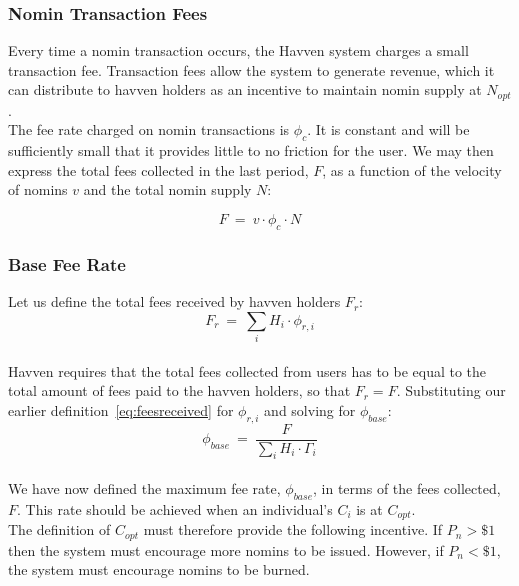 \newpage

\subsubsection{Nomin Transaction Fees}
Every time a nomin transaction occurs, the Havven system charges a small
transaction fee. Transaction fees allow the system to generate revenue, which
it can distribute to havven holders as an incentive to maintain nomin supply
at \(N_{opt}\). \\

\noindent The fee rate charged on nomin transactions is \(\phi_c\). It is
constant and will be sufficiently small that it provides little to no
friction for the user. We may then express the total fees collected in the
last period, \(F\), as a function of the velocity of nomins \(v\) and the total
nomin supply \(N\):

\begin{equation}
    F \ = \ v \cdot \phi_c \cdot N
\end{equation}

\subsubsection{Base Fee Rate}

Let us define the total fees received by havven holders \(F_{r}\): \\

\begin{equation}
F_{r} \ = \ \sum_{i} H_{i} \cdot \phi_{r,i} \label{eq:totalfeesreceived}
\end{equation} \\

\noindent Havven requires that the total fees collected from users has to be
equal to the total amount of fees paid to the havven holders, so that \(F_{r}
= F\). Substituting our earlier definition~\eqref{eq:feesreceived} for
\(\phi_{r,i}\) and solving for \(\phi_{base} \): \\

\begin{equation}
\phi_{base} \ = \ \frac{F}{\sum_{i} H_{i} \cdot \mathit{\Gamma}_{i}} \label{eq:feebase}
\end{equation} \\

\noindent We have now defined the maximum fee rate, \(\phi_{base}\), in terms
of the fees collected, \(F\). This rate should be achieved when an individual's
\(C_i\) is at \(C_{opt}\). \\

\noindent The definition of \(C_{opt}\) must therefore provide the following
incentive. If \(P_n > \$1\) then the system must encourage more nomins to be
issued. However, if \(P_n < \$1\), the system must encourage nomins to be
burned.
